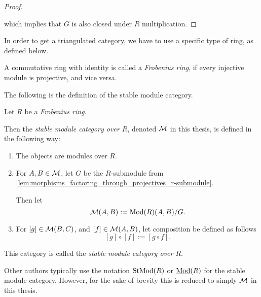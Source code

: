 \begin{proof}
\begin{center}
    \end{center}
    which implies that \( G \) is also closed under \( R \) multiplication.
\end{proof}

In order to get a triangulated category, we have to use a specific type of ring, as defined below.
\begin{definition}
    A commutative ring with identity is called a \emph{Frobenius ring}, if every injective module is projective, and vice versa.
\end{definition}

The following is the definition of the stable module category.
\begin{definition}
    \label{def:stable_module_category}
    Let \( R \) be a \emph{Frobenius ring}.

    Then the \emph{stable module category over \( R \)}, denoted \( {\mathcal{M}} \) in this thesis, is defined in the following way:
    \begin{enumerate}
        \item {
            The objects are modules over \( R \).
        }
        \item {
            For \( A, B \in {\mathcal{M}} \), let \( G \) be the \( R \)-submodule from \autoref{lem:morphisms_factoring_through_projectives_r-submodule}.
        
            Then let
            \[
                {\mathcal{M}}(A, B) := \operatorname{Mod}(R)(A, B)/G.
            \]
        }
        \item {
            For \( [g] \in {\mathcal{M}}(B, C) \), and \( [f] \in {\mathcal{M}}(A, B) \), let composition be defined as follows
            \[
                [g] \circ [f] := [g \circ f].
            \]
        }
    \end{enumerate}
    This category is called the \emph{stable module category over \( R \)}.
\end{definition}

Other authors typically use the notation \( \operatorname{StMod}(R) \) or \( \underline{\operatorname{Mod}}(R) \) for the stable module category. However, for the sake of brevity this is reduced to simply \( {\mathcal{M}} \) in this thesis.

